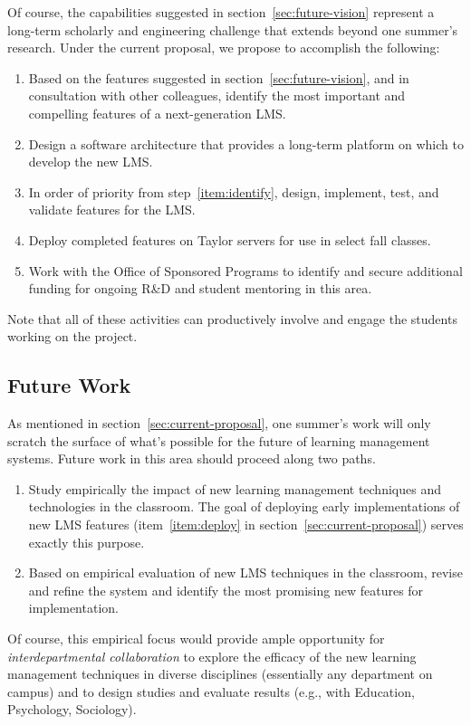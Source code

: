 \documentclass{article}
\begin{document}
Of course,
the capabilities suggested in section~\ref{sec:future-vision}
represent a long-term scholarly and engineering challenge
that extends beyond one summer's research.
Under the current proposal,
we propose to accomplish the following:
\begin{enumerate}
\item\label{item:identify}
  Based on the features suggested in section~\ref{sec:future-vision},
  and in consultation with other colleagues,
  identify the most important and compelling features of
  a next-generation LMS.
\item Design a software architecture
  that provides a long-term platform on which to develop
  the new LMS.
\item In order of priority from step~\ref{item:identify},
  design, implement, test, and validate features for the LMS.
\item\label{item:deploy} Deploy completed features
  on Taylor servers for use in select fall classes.
\item Work with
  the Office of Sponsored Programs
  to identify and secure additional funding
  for ongoing R\&D and student mentoring in this area.
\end{enumerate}
Note that all of these activities can productively
involve and engage the students working on the project.

\subsection{Future Work}
\label{sec:future-work}

As mentioned in section~\ref{sec:current-proposal},
one summer's work will only scratch the surface of what's
possible for the future of learning management systems.
Future work in this area should proceed along two paths.
\begin{enumerate}
\item Study empirically the impact of new learning management
  techniques and technologies in the classroom.
  The goal of deploying early implementations of new LMS features
  (item~\ref{item:deploy} in section~\ref{sec:current-proposal})
  serves exactly this purpose.
\item Based on empirical evaluation of new LMS techniques
  in the classroom,
  revise and refine the system
  and identify the most promising new features
  for implementation.
\end{enumerate}

Of course,
this empirical focus would provide
ample opportunity for
\emph{interdepartmental collaboration}
to explore the efficacy of the new learning management techniques
in diverse disciplines
(essentially any department on campus)
and to design studies and evaluate results
(e.g., with Education, Psychology, Sociology).
\end{document}
